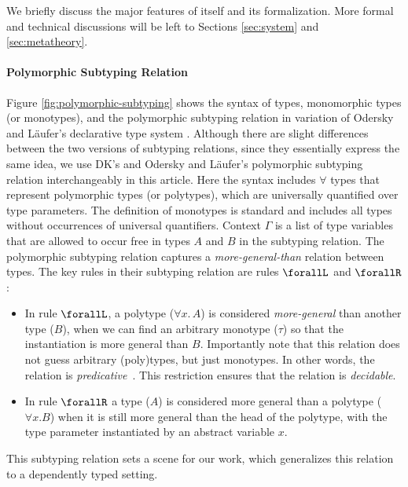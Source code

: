 We briefly discuss the major features of \name itself and
its formalization. More formal and technical discussions will be left to
Sections \ref{sec:system} and \ref{sec:metatheory}.

\paragraph{Polymorphic Subtyping Relation}
Figure \ref{fig:polymorphic-subtyping} shows the syntax of types, monomorphic types (or monotypes),
and the polymorphic subtyping relation in \cite{dunfield2013complete} variation of
Odersky and L\"aufer's declarative type system \citep{odersky1996putting}. Although there
are slight differences between the two versions of subtyping relations, since they essentially express
the same idea, we use DK's and Odersky and L\"aufer's polymorphic subtyping relation interchangeably
in this article.
Here the syntax includes $\forall$ types that represent polymorphic types (or polytypes),
which are universally quantified over type parameters. The definition of monotypes
is standard and includes all types without occurrences of universal quantifiers.
Context $\Gamma$ is a list of type variables that are allowed to occur free in types
$A$ and $B$ in the subtyping relation.
The polymorphic subtyping relation captures a \emph{more-general-than} relation
between types. The key rules in their subtyping relation are rules $\forallL$
and $\forallR$:

\begin{itemize}
  \item In rule $\forallL$, a polytype ($\forall x.\, A$) is considered \emph{more-general}
        than another type ($B$), when we can find an arbitrary monotype ($\tau$)
        so that the instantiation is more general than $B$.
        Importantly note that this relation does not guess arbitrary (poly)types,
        but just monotypes. In other words, the relation is \emph{predicative}~\citep{Martin-Lof-1972}.
        This restriction ensures that the relation is \emph{decidable}.

  \item In rule $\forallR$ a type ($A$) is considered more general than a polytype ($\forall x. B$)
        when it is still more general than the head of the polytype, with the type
        parameter instantiated by an abstract variable $x$.
\end{itemize}

This subtyping relation sets a scene for our work, which
generalizes this relation to a dependently typed setting.

